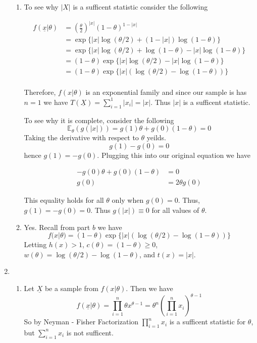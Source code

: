 \documentclass[12pt]{article}  %
\newcommand{\E}{{\mathbb{E}}}
\begin{document}
\begin{enumerate}
\begin{enumerate}
\item To see why $|X|$ is a sufficent statistic consider the following 

\begin{align*}
f(\underline{x}|\theta) &= \left(\frac{\theta}{2}\right)^{|x|}(1-\theta)^{1-|x|}\\
&=\exp\big\{|x|\log(\theta/2) + (1-|x|)\log(1-\theta)\big\}\\
&=\exp\big\{|x|\log(\theta/2) + \log(1-\theta) -|x|\log(1-\theta)\big\}\\
&= (1-\theta)\exp\big\{|x|\log(\theta/2) -|x|\log(1-\theta)\big\}\\
&= (1-\theta)\exp\big\{|x|(\log(\theta/2) -\log(1-\theta))\big\}\\
\end{align*}

Therefore, $f(x|\theta)$ is an exponential family and since our sample is has $n=1$ we have $T(\underline{X}) = \sum_{i=1}^{1}|x_i| = |x|$. Thus $|x|$ is a sufficent statistic. 

To see why it is complete, consider the following 
$$\E_{\theta}(g(|x|)) = g(1)\theta + g(0)(1-\theta) = 0 $$
Taking the derivative with respect to $\theta$ yeilds. $$g(1)-g(0) = 0$$ hence $g(1) = -g(0)$. Plugging this into our original equation we have 

\begin{align*}
-g(0)\theta + g(0)(1-\theta) &= 0\\
g(0) &= 2\theta g(0)
\end{align*}

This equality holds for all $\theta$ only when $g(0) = 0$. Thus, $g(1) = -g(0) = 0$. Thus $g(|x|) \equiv 0$ for all values of $\theta$. 

\item Yes. Recall from part $b$ we have $$f(x|\theta) = (1-\theta)\exp\big\{|x|(\log(\theta/2) -\log(1-\theta))\big\}$$ Letting $h(x)>1$, $c(\theta) = (1-\theta)\geq 0$, $w(\theta) = \log(\theta/2) -\log(1-\theta)$, and $t(x) = |x|$. 

\end{enumerate}

\item 
\begin{enumerate}
\item Let $\underline{X}$ be a sample from $f(x|\theta)$. Then we have $$f(\underline{x}|\theta) = \prod_{i=1}^{n}\theta x^{\theta -1} = \theta^n\left(\prod_{i=1}^{n}x_i\right)^{\theta -1}$$ So by Neyman - Fisher Factorization $\prod_{i=1}^{n}x_i$ is a sufficent statistic for $\theta$, but $\sum_{i=1}^{n}x_i$ is not sufficent. 


\end{enumerate}
\end{enumerate}
\end{document}
